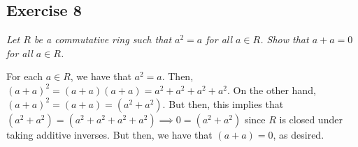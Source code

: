 \subsection*{Exercise 8}
\textit{Let $R$ be a commutative ring such that $a^2 = a$ for all $a \in R$. Show that $a + a = 0$ for all $a \in R$.}

\vspace{5 mm}
For each $a \in R$, we have that $a^2 = a$. Then, $(a + a)^2 = (a + a)(a + a) = a^2 + a^2 + a^2 + a^2$. On the other hand, $(a + a)^2 = (a + a) = (a^2 + a^2)$. But then, this implies that $(a^2 + a^2) = (a^2 + a^2 + a^2 + a^2) \implies 0 = (a^2 + a^2)$ since $R$ is closed under taking additive inverses. But then, we have that $(a + a) = 0$, as desired.